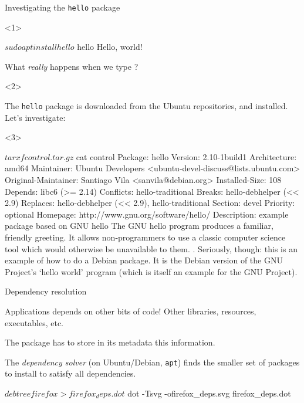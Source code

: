 \documentclass[compress]{beamer}
\begin{document}
\begin{frame}[fragile,label=deb]{Investigating the \texttt{hello} package}
    \begin{onlyenv}<1>

\begin{shcode}
$ sudo apt install hello
$ hello
Hello, world!
\end{shcode}

    What \emph{really} happens when we type ?

    \end{onlyenv}
    \begin{onlyenv}<2>

    The \texttt{hello} package is downloaded from the Ubuntu repositories, and
    installed. Let's investigate:


    \end{onlyenv}
    \begin{onlyenv}<3>


\begin{shcode}
$ tar xf control.tar.gz
$ cat control
Package: hello
Version: 2.10-1build1
Architecture: amd64
Maintainer: Ubuntu Developers <ubuntu-devel-discuss@lists.ubuntu.com>
Original-Maintainer: Santiago Vila <sanvila@debian.org>
Installed-Size: 108
Depends: libc6 (>= 2.14)
Conflicts: hello-traditional
Breaks: hello-debhelper (<< 2.9)
Replaces: hello-debhelper (<< 2.9), hello-traditional
Section: devel
Priority: optional
Homepage: http://www.gnu.org/software/hello/
Description: example package based on GNU hello
 The GNU hello program produces a familiar, friendly greeting.  It
 allows non-programmers to use a classic computer science tool which
 would otherwise be unavailable to them.
 .
 Seriously, though: this is an example of how to do a Debian package.
 It is the Debian version of the GNU Project's `hello world' program
 (which is itself an example for the GNU Project).
\end{shcode}

    \end{onlyenv}
\end{frame}

\begin{frame}[fragile]{Dependency resolution}

Applications depends on other bits of code! Other libraries, resources,
executables, etc.

The package has to store in its metadata this information.

The \emph{dependency solver} (on Ubuntu/Debian, \texttt{apt}) finds the
smaller set of packages to install to satisfy all dependencies.

\pause

\begin{shcode}
$ debtree firefox > firefox_deps.dot
$ dot -Tsvg -ofirefox_deps.svg firefox_deps.dot
\end{shcode}

\end{frame}
\end{document}
